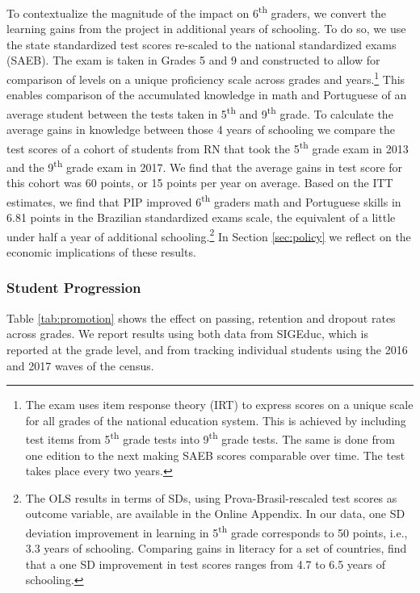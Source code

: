 \documentclass[11pt,a4paper]{article}
\begin{document}
To contextualize the magnitude of the impact on 6\textsuperscript{th} graders, we convert the learning gains from the project in additional years of schooling. To do so, we use the state standardized test scores re-scaled to the national standardized exams (SAEB). The exam is taken in Grades 5 and 9 and constructed to allow for comparison of levels on a unique proficiency scale across grades and years.\footnote{The exam uses item response theory (IRT) to express scores on a unique scale for all grades of the national education system. This is achieved by including test items from 5\textsuperscript{th} grade tests into 9\textsuperscript{th} grade tests. The same is done from one edition to the next making SAEB scores comparable over time. The test takes place every two years.} This enables comparison of the accumulated knowledge in math and Portuguese of an average student between the tests taken in 5\textsuperscript{th} and 9\textsuperscript{th} grade. To calculate the average gains in knowledge between those 4 years of schooling we compare the test scores of a cohort of students from RN that took the 5\textsuperscript{th} grade exam in 2013 and the 9\textsuperscript{th} grade exam in 2017. We find that the average gains in test score for this cohort was 60 points, or 15 points per year on average. Based on the ITT estimates, we find that PIP improved 6\textsuperscript{th} graders math and Portuguese skills in 6.81 points in the Brazilian standardized exams scale, the equivalent of a little under half a year of additional schooling.\footnote{The OLS results in terms of SDs, using Prova-Brasil-rescaled test scores as outcome variable, are available in the Online Appendix. In our data, one SD deviation improvement in learning in 5\textsuperscript{th} grade corresponds to 50 points, i.e., 3.3 years of schooling. Comparing gains in literacy for a set of countries, \citet{evans2019equivalent} find that a one SD improvement in test scores ranges from 4.7 to 6.5 years of schooling.} In Section \ref{sec:policy} we reflect on the economic implications of these results.


\subsubsection*{Student Progression} \label{sec:flow}

Table \ref{tab:promotion} shows the effect on passing, retention and dropout rates across grades. We report results using both data from SIGEduc, which is reported at the grade level, and from tracking individual students using the 2016 and 2017 waves of the census. 
\end{document}
